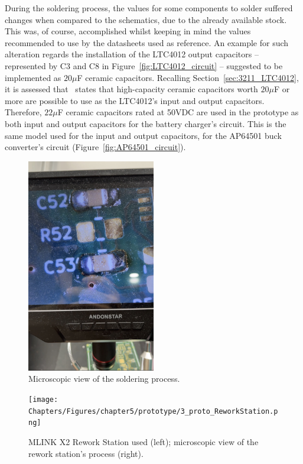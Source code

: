 During the soldering process, the values for some components to solder suffered changes when compared to the schematics, due to the already available stock. This was, of course, accomplished whilst keeping in mind the values recommended to use by the datasheets used as reference. An example for such alteration regards the installation of the LTC4012 output capacitors -- represented by C3 and C8 in Figure~\ref{fig:LTC4012_circuit} -- suggested to be implemented as $20 \mu$F ceramic capacitors. Recalling Section~\ref{sec:3211_LTC4012}, it is assessed that~\cite{LTC4012} states that high-capacity ceramic capacitors worth $20 \mu$F or more are possible to use as the LTC4012's input and output capacitors. Therefore, $22 \mu$F ceramic capacitors rated at 50VDC are used in the prototype as both input and output capacitors for the battery charger's circuit. This is the same model used for the input and output capacitors, for the AP64501 buck converter's circuit (Figure~\ref{fig:AP64501_circuit}).



\begin{figure}[h]
	\centering
	\includegraphics[width=0.5\textwidth]{Chapters/Figures/chapter5/prototype/3_proto_Microscope_Capacitors.png}
	\caption{Microscopic view of the soldering process.}
	\label{fig:3_proto_Microscope_Capacitors}
\end{figure}%


\begin{figure}[h]
	\centering
	\texttt{[image: Chapters/Figures/chapter5/prototype/3\_proto\_ReworkStation.png]}
	\caption{MLINK X2 Rework Station used (left); microscopic view of the rework station's process (right).}
	\label{fig:3_proto_ReworkStation}
\end{figure}%

